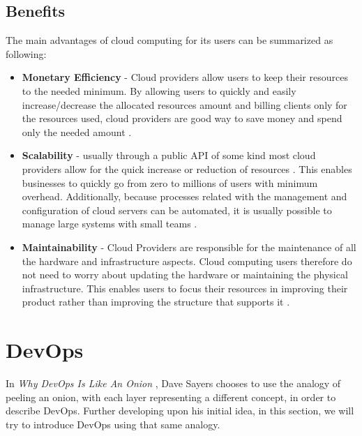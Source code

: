   		\subsection{Benefits} \label{chap:stateoftheheart:sec:cloud:sec:benefits}
  			The main advantages of cloud computing for its users can be summarized as following:
  			\begin{itemize}
  				\item \textbf{Monetary Efficiency} - Cloud providers allow users to keep their resources to the needed minimum. By allowing users to quickly and easily increase/decrease the allocated resources amount and billing clients only for the resources used, cloud providers are good way to save money and spend only the needed amount \cite{Garrison2012,Mell2011}.
  				\item \textbf{Scalability} - usually through a public API of some kind most cloud providers allow for the quick increase or reduction of resources \cite{Mell2011}. This enables businesses to quickly go from zero to millions of users with minimum overhead. Additionally, because processes related with the management and configuration of cloud servers can be automated, it is usually possible to manage large systems with small teams \cite{Loukides2012}.
  	    	\item \textbf{Maintainability} - Cloud Providers are responsible for the maintenance of all the hardware and infrastructure aspects. Cloud computing users therefore do not need to worry about updating the hardware or maintaining the physical infrastructure. This enables users to focus their resources in improving their product rather than improving the structure that supports it \cite{Garrison2012}.
  			\end{itemize}

	\section{DevOps} \label{chap:stateoftheart:sec:devops}
      In \textit{Why DevOps Is Like An Onion} \cite{DaveSayers2013}, Dave Sayers chooses to use the analogy of peeling an onion, with each layer representing a different concept, in order to describe DevOps. Further developing upon his initial idea, in this section, we will try to introduce DevOps using that same analogy.

